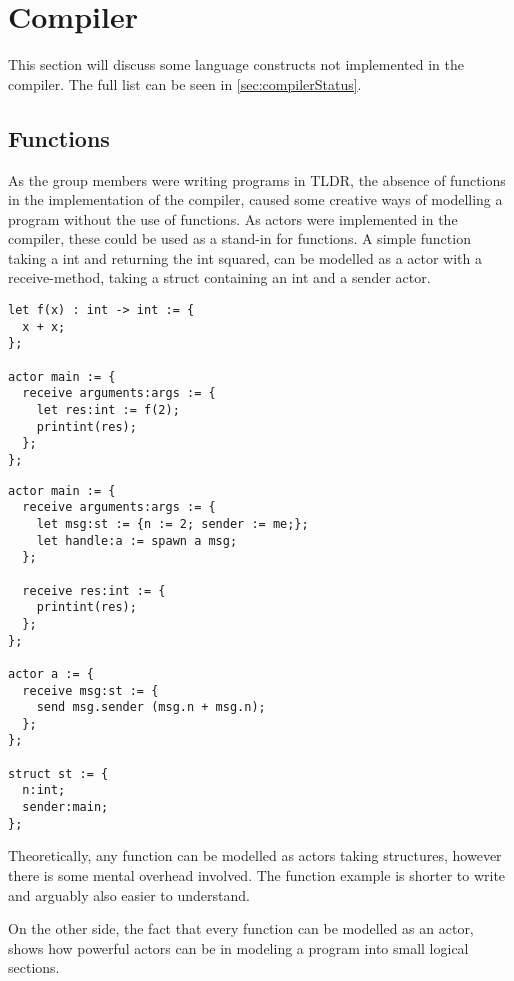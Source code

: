 \section{Compiler}

This section will discuss some language constructs not implemented in the compiler. The full list can be seen in \cref{sec:compilerStatus}.

\subsection{Functions}\label{dis:func}

As the group members were writing programs in TLDR, the absence of functions in the implementation of the compiler, caused some creative ways of modelling a program without the use of functions. As actors were implemented in the compiler, these could be used as a stand-in for functions. A simple function taking a int and returning the int squared, can be modelled as a actor with a receive-method, taking a struct containing an int and a sender actor. 

\begin{lstlisting}[style=TLDR, caption = {Simple example using a function.}]
let f(x) : int -> int := {
  x + x;
};

actor main := {
  receive arguments:args := {
    let res:int := f(2);
    printint(res);
  };
};
\end{lstlisting}
\begin{lstlisting}[style=TLDR, caption = {Example of modeling a function taking a int and returning the int squared, as an actor.}]
actor main := {
  receive arguments:args := {
    let msg:st := {n := 2; sender := me;};
    let handle:a := spawn a msg;
  };
  
  receive res:int := {
    printint(res);
  };
};

actor a := {
  receive msg:st := {
    send msg.sender (msg.n + msg.n);
  };
};

struct st := {
  n:int;
  sender:main;
};
\end{lstlisting}

Theoretically, any function can be modelled as actors taking structures, however there is some mental overhead involved. The function example is shorter to write and arguably also easier to understand.

On the other side, the fact that every function can be modelled as an actor, shows how powerful actors can be in modeling a program into small logical sections.

